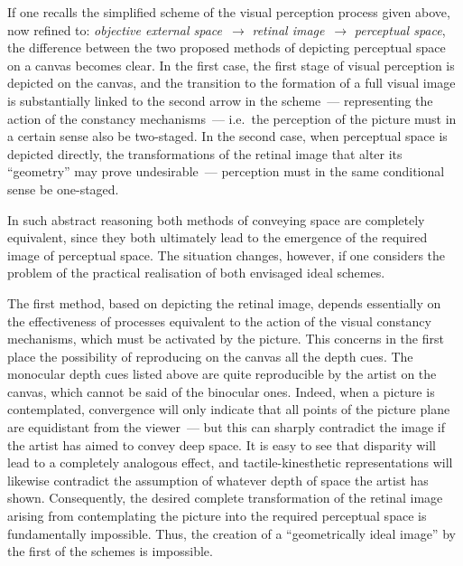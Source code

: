 
If one recalls the simplified scheme of the visual perception process given above, now
refined to: \emph{objective external space}~$\to$ \emph{retinal image}~$\to$
\emph{perceptual space}, the difference between the two proposed methods of
depicting perceptual space on a canvas becomes clear.  In the first case, the first stage
of visual perception is depicted on the canvas, and the transition to the formation of a
full visual image is substantially linked to the second arrow in the scheme~--- representing
the action of the constancy mechanisms~--- i.e.\ the perception of the picture must in a
certain sense also be two-staged.  In the second case, when perceptual space is depicted
directly, the transformations of the retinal image that alter its ``geometry'' may prove
undesirable~--- perception must in the same conditional sense be one-staged.

In such abstract reasoning both methods of conveying space are completely equivalent,
since they both ultimately lead to the emergence of the required image of perceptual
space.  The situation changes, however, if one considers the problem of the practical
realisation of both envisaged ideal schemes.

The first method, based on depicting the retinal image, depends essentially on the
effectiveness of processes equivalent to the action of the visual constancy mechanisms,
which must be activated by the picture.  This concerns in the first place the possibility
of reproducing on the canvas all the depth cues.  The monocular depth cues listed above
are quite reproducible by the artist on the canvas, which cannot be said of the binocular
ones.  Indeed, when a picture is contemplated, convergence will only indicate that all
points of the picture plane are equidistant from the viewer~--- but this can sharply
contradict the image if the artist has aimed to convey deep space.  It is easy to see that
disparity will lead to a completely analogous effect, and tactile-kinesthetic
representations will likewise contradict the assumption of whatever depth of space the
artist has shown.  Consequently, the desired complete transformation of the retinal image
arising from contemplating the picture into the required perceptual space is fundamentally
impossible.  Thus, the creation of a ``geometrically ideal image'' by the first of the
schemes is impossible.

